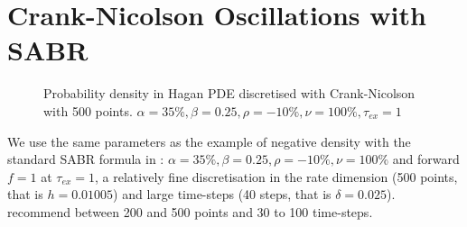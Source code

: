 \documentclass[]{rAMF2e}
\begin{document}
\section{Crank-Nicolson Oscillations with SABR}\label{section_cn}
\begin{figure}[htb]
  \begin{center}  
  \end{center}
     \caption{\label{fig:density_hagan_cn_500_40} Probability density in Hagan PDE discretised with Crank-Nicolson with 500 points. $\alpha=35\%, \beta=0.25, \rho=-10\%, \nu=100\%, \tau_{ex}=1$}
\end{figure}

We use the same parameters as the example of negative density with the standard SABR formula in \citep{hagan2013arbitrage}: $\alpha=35\%, \beta=0.25, \rho=-10\%, \nu=100\%$ and forward $f=1$ at $\tau_{ex}=1$, a relatively fine discretisation in the rate dimension (500 points, that is $h = 0.01005$) and large time-steps (40 steps, that is $\delta=0.025$). \cite{hagan2013arbitrage} recommend between 200 and 500 points and 30 to 100 time-steps.
\end{document}
